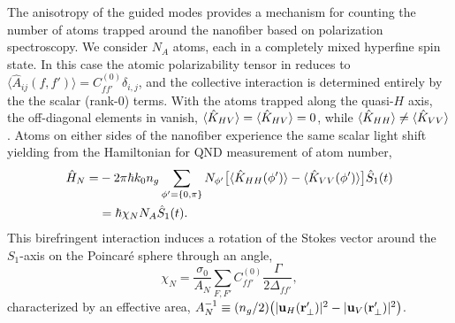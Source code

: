 \documentclass[preprint, aps,pra,onecolumn]{revtex4-1} %
\newcommand{\polcomp}{\hat{K}} %
\newcommand{\chiN}{\chi_{N}}
\newcommand{\Abir}{A_N}
\begin{document}
The anisotropy of the guided modes provides a mechanism for counting the number of atoms trapped around the nanofiber based on polarization spectroscopy.  
We consider $N_A$ atoms, each in a completely mixed {\color{blue} hyperfine spin} state. In this case the atomic polarizability tensor in  reduces to $\langle \hat{A}_{ij}(f,f') \rangle = C_{ff'}^{(0)} \delta_{i,j}$, and the collective interaction is determined entirely by the the scalar (rank-0) terms.  
With the atoms trapped along the quasi-$H$ axis, the off-diagonal elements in  vanish, $\expt{ \polcomp_{HV} } = \expt{ \polcomp_{HV} } =0$, while $\expt{ \polcomp_{HH} } \neq  \expt{ \polcomp_{VV} }$.  
Atoms on either sides of the nanofiber experience the same scalar light shift yielding from   the Hamiltonian for QND measurement of atom number,
	\begin{align}
		\hat{H}_{N} =& -2\pi \hbar k_0 n_g \sum_{\phi' = \{0,\pi \}} N_{\phi'} \big[ \expt{ \polcomp_{HH}(\phi')}  - \expt{ \polcomp_{VV}(\phi')} \big] \hat{S}_1(t)  \nonumber \\
		& =  \hbar \chiN N_A \hat{S}_1(t).  \label{Eq::MixedHamiltonian}
	\end{align}	
This birefringent interaction induces a rotation of the Stokes vector  around the $S_1$-axis on the Poincar\'{e} sphere through an angle, 
	\begin{equation} \label{Eq::RotationAngle}
		\chiN = \frac{\sigma_0}{\Abir}  \sum_{F,F'}  C_{ff'}^{(0)} \frac{\Gamma}{2 \Delta_{ff'}},
	\end{equation}
characterized by an effective area, $\Abir^{-1} \equiv (n_g/2) \big( |\mathbf{u}_{H}(\br'_\perp)|^2 - |\mathbf{u}_{V}(\br'_\perp)| ^2 \big)$.   
\end{document}
